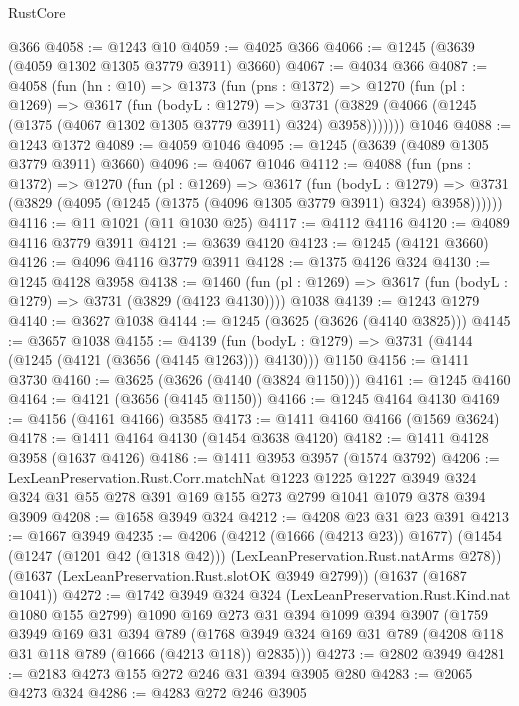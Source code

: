 \begin{lexlean}{RustCore}
\begin{coremodule}
    @366
@4058 := @1243 @10
@4059 := @4025 @366
@4066 := @1245 (@3639 (@4059 @1302 @1305 @3779 @3911) @3660)
@4067 := @4034 @366
@4087 := @4058
    (fun (hn : @10) =>
    @1373
      (fun (pns : @1372) =>
      @1270
        (fun (pl : @1269) =>
        @3617
          (fun (bodyL : @1279) =>
          @3731 (@3829 (@4066 (@1245 (@1375 (@4067 @1302 @1305 @3779 @3911) @324) @3958)))))))
    @1046
@4088 := @1243 @1372
@4089 := @4059 @1046
@4095 := @1245 (@3639 (@4089 @1305 @3779 @3911) @3660)
@4096 := @4067 @1046
@4112 := @4088
    (fun (pns : @1372) =>
    @1270
      (fun (pl : @1269) =>
      @3617
        (fun (bodyL : @1279) =>
        @3731 (@3829 (@4095 (@1245 (@1375 (@4096 @1305 @3779 @3911) @324) @3958))))))
@4116 := @11 @1021 (@11 @1030 @25)
@4117 := @4112 @4116
@4120 := @4089 @4116 @3779 @3911
@4121 := @3639 @4120
@4123 := @1245 (@4121 @3660)
@4126 := @4096 @4116 @3779 @3911
@4128 := @1375 @4126 @324
@4130 := @1245 @4128 @3958
@4138 := @1460
    (fun (pl : @1269) => @3617 (fun (bodyL : @1279) => @3731 (@3829 (@4123 @4130))))
    @1038
@4139 := @1243 @1279
@4140 := @3627 @1038
@4144 := @1245 (@3625 (@3626 (@4140 @3825)))
@4145 := @3657 @1038
@4155 := @4139
    (fun (bodyL : @1279) => @3731 (@4144 (@1245 (@4121 (@3656 (@4145 @1263))) @4130)))
    @1150
@4156 := @1411 @3730
@4160 := @3625 (@3626 (@4140 (@3824 @1150)))
@4161 := @1245 @4160
@4164 := @4121 (@3656 (@4145 @1150))
@4166 := @1245 @4164 @4130
@4169 := @4156 (@4161 @4166) @3585
@4173 := @1411 @4160 @4166 (@1569 @3624)
@4178 := @1411 @4164 @4130 (@1454 @3638 @4120)
@4182 := @1411 @4128 @3958 (@1637 @4126)
@4186 := @1411 @3953 @3957 (@1574 @3792)
@4206 := LexLeanPreservation.Rust.Corr.matchNat
    @1223
    @1225
    @1227
    @3949
    @324
    @324
    @31
    @55
    @278
    @391
    @169
    @155
    @273
    @2799
    @1041
    @1079
    @378
    @394
    @3909
@4208 := @1658 @3949 @324
@4212 := @4208 @23 @31 @23 @391
@4213 := @1667 @3949
@4235 := @4206
    (@4212 (@1666 (@4213 @23)) @1677)
    (@1454 (@1247 (@1201 @42 (@1318 @42))) (LexLeanPreservation.Rust.natArms @278))
    (@1637 (LexLeanPreservation.Rust.slotOK @3949 @2799))
    (@1637 (@1687 @1041))
@4272 := @1742
    @3949
    @324
    @324
    (LexLeanPreservation.Rust.Kind.nat @1080 @155 @2799)
    @1090
    @169
    @273
    @31
    @394
    @1099
    @394
    @3907
    (@1759
      @3949
      @169
      @31
      @394
      @789
      (@1768 @3949 @324 @169 @31 @789 (@4208 @118 @31 @118 @789 (@1666 (@4213 @118)) @2835)))
@4273 := @2802 @3949
@4281 := @2183 @4273 @155 @272 @246 @31 @394 @3905 @280
@4283 := @2065 @4273 @324
@4286 := @4283 @272 @246 @3905

\end{coremodule}
\end{lexlean}
